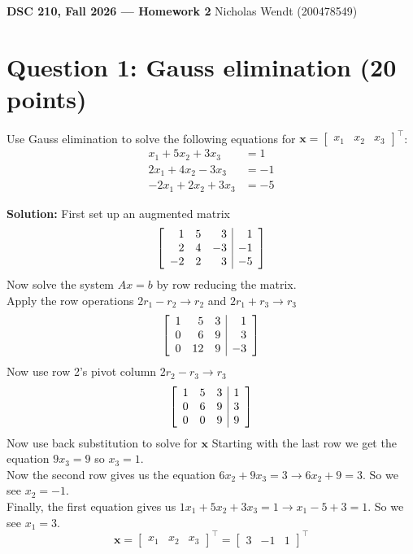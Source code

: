 \documentclass[11pt]{article}
\newenvironment{amatrix}[1]{\left[\begin{array}{*{#1}{r}|r}}{\end{array}\right]}
\begin{document}
\textbf{DSC 210, Fall 2026 --- Homework 2} \hfill Nicholas Wendt (200478549)

\section*{Question 1: Gauss elimination (20 points)}

Use Gauss elimination to solve the following equations for $\mathbf{x} = \begin{bmatrix} x_1 & x_2 & x_3 \end{bmatrix}^\top$:
\begin{align*}
    x_1 + 5x_2 + 3x_3 &= 1\\
    2x_1 + 4x_2 - 3x_3 &= -1\\
    -2x_1 + 2x_2 + 3x_3 &= -5
\end{align*}

\textbf{Solution:} First set up an augmented matrix
$$
\begin{amatrix}{3}
    1&5&3&1\\
    2&4&-3&-1\\
    -2&2&3&-5
\end{amatrix}
$$
Now solve the system $Ax=b$ by row reducing the matrix.\\
Apply the row operations $2r_1-r_2 \rightarrow r_2$ and $2r_1+r_3 \rightarrow r_3$
$$
\begin{amatrix}{3}
    1&5&3&1\\
    0&6&9&3\\
    0&12&9&-3
\end{amatrix}
$$
Now use row 2's pivot column $2r_2-r_3 \rightarrow r_3$
$$
\begin{amatrix}{3}
    1&5&3&1\\
    0&6&9&3\\
    0&0&9&9
\end{amatrix}
$$
Now use back substitution to solve for $\mathbf{x}$
Starting with the last row we get the equation $9x_3=9$ so $x_3=1$.\\
Now the second row gives us the equation $6x_2+9x_3 = 3 \rightarrow 6x_2+9=3$. So we see $x_2 = -1$.\\
Finally, the first equation gives us $1x_1+5x_2+3x_3 = 1 \rightarrow x_1-5+3=1$. So we see $x_1 = 3$.
$$
\mathbf{x} = \begin{bmatrix}
    x_1&x_2&x_3
\end{bmatrix}^\top=\begin{bmatrix}
    3&-1&1
\end{bmatrix}^\top
$$
\bigskip
\end{document}
